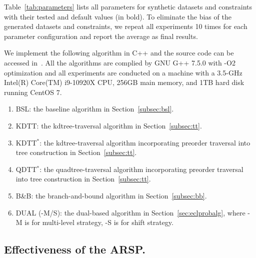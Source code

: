 Table~\ref{tab:parameters} lists all parameters for synthetic datasets and constraints with their tested and default values (in bold).
To eliminate the bias of the generated datasets and constraints, we repeat all experiments 10 times for each parameter configuration and report the average as final results.

We implement the following algorithm in C++ and the source code can be accessed in~\cite{github}.
All the algorithms are complied by GNU G++ 7.5.0 with -O2 optimization and all experiments are conducted on a machine with a 3.5-GHz Intel(R) Core(TM) i9-10920X CPU, 256GB main memory, and 1TB hard disk running CentOS 7.
\begin{enumerate}[$\bullet$]
	\item \textsc{BSL}: the baseline algorithm in Section~\ref{subsec:bsl}.
	\item \textsc{KDTT}: the kdtree-traversal algorithm in Section~\ref{subsec:tt}.
	\item \textsc{KDTT$^*$}: the kdtree-traversal algorithm incorporating preorder traversal into tree construction in Section~\ref{subsec:tt}. 
	\item \textsc{QDTT$^*$}: the quadtree-traversal algorithm incorporating preorder traversal into tree construction in Section~\ref{subsec:tt}. 
	\item \textsc{B\&B}: the branch-and-bound algorithm in Section~\ref{subsec:bb}.
	\item \textsc{DUAL} (\textsc{-M/S}): the dual-based algorithm in Section~\ref{sec:eclprobalg}, where \textsc{-M} is for multi-level strategy, \textsc{-S} is for shift strategy.
\end{enumerate}


\subsection{Effectiveness of the ARSP.}

